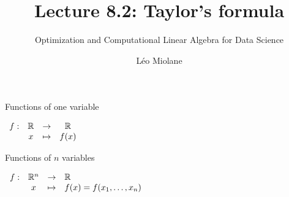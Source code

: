 \documentclass{beamer}
\title{Lecture 8.2: Taylor's formula}
\subtitle{Optimization and Computational Linear Algebra for Data Science}
\author{Léo Miolane}
\date{}
\begin{document}
\setcounter{showProgressBar}{0}
\setcounter{showSlideNumbers}{0}

\frame{\titlepage}
\setcounter{framenumber}{0}
\setcounter{showSlideNumbers}{1}


\begin{frame}[t]{Functions of one variable}
	\grid 

			$\displaystyle
			\begin{array}{cccc}
				f: & \mathbb{R} & \to & \mathbb{R} \\
				   & x & \mapsto & f(x)
			\end{array}
			$

			\pause

\end{frame}
\begin{frame}[t]{Functions of $n$ variables}
	\grid 

			$\displaystyle
			\begin{array}{cccl}
				f: & \mathbb{R}^n & \to & \mathbb{R} \\
				   & x & \mapsto & f(x) = f(x_1, \dots, x_n)
			\end{array}
			$

\end{frame}
\end{document}
